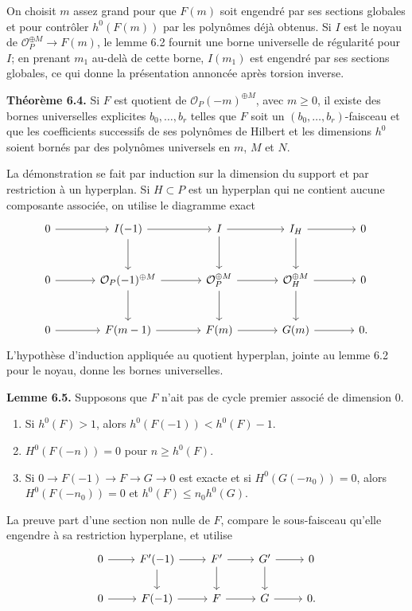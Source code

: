 \documentclass[11pt]{article}
\begin{document}
On choisit $m$ assez grand pour que $F(m)$ soit engendr\'e par ses sections globales et pour contr\^oler $h^0(F(m))$ par les polyn\^omes d\'ej\`a obtenus. Si $I$ est le noyau de $\mathcal O_P^{\oplus M}\to F(m)$, le lemme 6.2 fournit une borne universelle de r\'egularit\'e pour $I$; en prenant $m_1$ au-del\`a de cette borne, $I(m_1)$ est engendr\'e par ses sections globales, ce qui donne la pr\'esentation annonc\'ee apr\`es torsion inverse.

\textbf{Th\'eor\`eme 6.4.} Si $F$ est quotient de $\mathcal O_P(-m)^{\oplus M}$, avec $m\ge0$, il existe des bornes universelles explicites $b_0,\ldots,b_r$ telles que $F$ soit un $(b_0,\ldots,b_r)$-faisceau et que les coefficients successifs de ses polyn\^omes de Hilbert et les dimensions $h^0$ soient born\'es par des polyn\^omes universels en $m$, $M$ et $N$.

La d\'emonstration se fait par induction sur la dimension du support et par restriction \`a un hyperplan. Si $H\subset P$ est un hyperplan qui ne contient aucune composante associ\'ee, on utilise le diagramme exact
\[
\begin{tikzcd}[column sep=large,row sep=large]
0 \arrow[r] & I(-1) \arrow[r] \arrow[d] & I \arrow[r] \arrow[d] & I_H \arrow[r] \arrow[d] & 0 \\
0 \arrow[r] & \mathcal O_P(-1)^{\oplus M} \arrow[r] \arrow[d] & \mathcal O_P^{\oplus M} \arrow[r] \arrow[d] & \mathcal O_H^{\oplus M} \arrow[r] \arrow[d] & 0 \\
0 \arrow[r] & F(m-1) \arrow[r] & F(m) \arrow[r] & G(m) \arrow[r] & 0 .
\end{tikzcd}
\]
L'hypoth\`ese d'induction appliqu\'ee au quotient hyperplan, jointe au lemme 6.2 pour le noyau, donne les bornes universelles.

\textbf{Lemme 6.5.} Supposons que $F$ n'ait pas de cycle premier associ\'e de dimension $0$.
\begin{enumerate}[label=\roman*)]
\item Si $h^0(F)>1$, alors $h^0(F(-1))<h^0(F)-1$.
\item $H^0(F(-n))=0$ pour $n\ge h^0(F)$.
\item Si $0\to F(-1)\to F\to G\to0$ est exacte et si $H^0(G(-n_0))=0$, alors $H^0(F(-n_0))=0$ et $h^0(F)\le n_0h^0(G)$.
\end{enumerate}
La preuve part d'une section non nulle de $F$, compare le sous-faisceau qu'elle engendre \`a sa restriction hyperplane, et utilise
\[
\begin{tikzcd}
0 \arrow[r] & F'(-1) \arrow[r] \arrow[d] & F' \arrow[r] \arrow[d] & G' \arrow[r] \arrow[d] & 0 \\
0 \arrow[r] & F(-1) \arrow[r] & F \arrow[r] & G \arrow[r] & 0 .
\end{tikzcd}
\]
\end{document}
